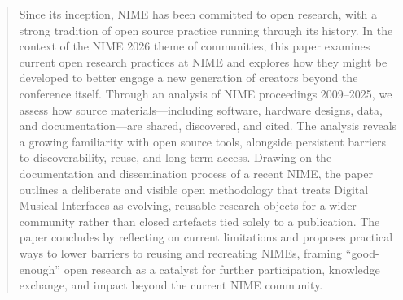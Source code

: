 \documentclass[sigconf]{nimeart}
\begin{document}
\begin{abstract}
Since its inception, NIME has been committed to open research, with a strong tradition of open source practice running through its history. In the context of the NIME 2026 theme of communities, this paper examines current open research practices at NIME and explores how they might be developed to better engage a new generation of creators beyond the conference itself.
Through an analysis of NIME proceedings 2009--2025, we assess how source materials—including software, hardware designs, data, and documentation—are shared, discovered, and cited. The analysis reveals a growing familiarity with open source tools, alongside persistent barriers to discoverability, reuse, and long-term access.
Drawing on the documentation and dissemination process of a recent NIME, the paper outlines a deliberate and visible open methodology that treats Digital Musical Interfaces as evolving, reusable research objects for a wider community rather than closed artefacts tied solely to a publication. 
The paper concludes by reflecting on current limitations and proposes practical ways to lower barriers to reusing and recreating NIMEs, framing ``good-enough'' open research as a catalyst for further participation, knowledge exchange, and impact beyond the current NIME community.
\end{abstract}

\end{document}
